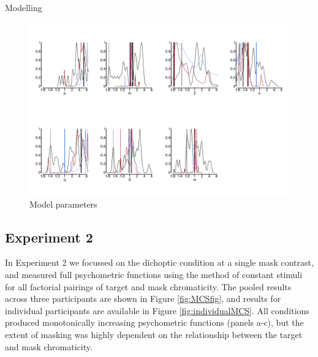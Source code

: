 \documentclass[
]{article}
\begin{document}
Modelling

\begin{figure}

{\centering \includegraphics{Figures/modelparams} 

}

\caption{Model parameters}\label{fig:params}
\end{figure}

\hypertarget{experiment-2}{%
\subsection{Experiment 2}\label{experiment-2}}

In Experiment 2 we focussed on the dichoptic condition at a single mask contrast, and measured full psychometric functions using the method of constant stimuli for all factorial pairings of target and mask chromaticity. The pooled results across three participants are shown in Figure \ref{fig:MCSfig}, and results for individual participants are available in Figure \ref{fig:individualMCS}. All conditions produced monotonically increasing psychometric functions (panels a-c), but the extent of masking was highly dependent on the relationship between the target and mask chromaticity.
\end{document}
